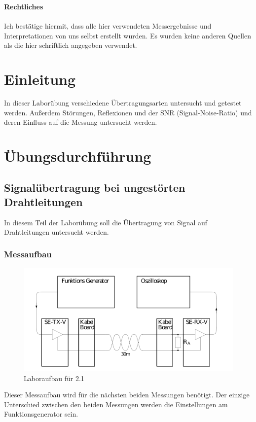 \documentclass[a4paper,12pt]{article}
\begin{document}
	
	
	\noindent
	\textbf{\Large Rechtliches} \\ \\
	Ich bestätige hiermit, dass alle hier verwendeten Messergebnisse und Interpretationen von uns selbst erstellt wurden. Es wurden keine anderen Quellen als die hier schriftlich angegeben verwendet.
	
	\newpage
	\tableofcontents
	
	\newpage
	\section{Einleitung}
	In dieser Laborübung verschiedene Übertragungsarten untersucht und getestet werden. Außerdem Störungen, Reflexionen und der SNR (Signal-Noise-Ratio) und deren Einfluss auf die Messung untersucht werden.
	
	\section{Übungsdurchführung}
	\subsection{Signalübertragung bei ungestörten Drahtleitungen}
	In diesem Teil der Laborübung soll die Übertragung von Signal auf Drahtleitungen untersucht werden.
	\subsubsection{Messaufbau}
	\begin{figure}[h]
		\centering
		\includegraphics[width=15cm]{img/Messaufbau_2_1}
		\caption{Laboraufbau für 2.1}
	\end{figure}
	\noindent
	Dieser Messaufbau wird für die nächsten beiden Messungen benötigt. Der einzige Unterschied zwischen den beiden Messungen werden die Einstellungen am Funktionsgenerator sein.
	\newpage
\end{document}
